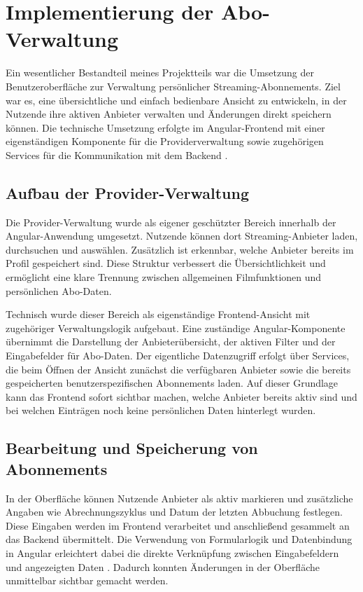 ﻿
\section{Implementierung der Abo-Verwaltung}
Ein wesentlicher Bestandteil meines Projektteils war die Umsetzung der Benutzeroberfläche zur Verwaltung persönlicher Streaming-Abonnements. Ziel war es, eine übersichtliche und einfach bedienbare Ansicht zu entwickeln, in der Nutzende ihre aktiven Anbieter verwalten und Änderungen direkt speichern können. Die technische Umsetzung erfolgte im Angular-Frontend mit einer eigenständigen Komponente für die Providerverwaltung sowie zugehörigen Services für die Kommunikation mit dem Backend \cite{angular_overview,angular_forms}.

\subsection{Aufbau der Provider-Verwaltung}
Die Provider-Verwaltung wurde als eigener geschützter Bereich innerhalb der Angular-Anwendung umgesetzt. Nutzende können dort Streaming-Anbieter laden, durchsuchen und auswählen. Zusätzlich ist erkennbar, welche Anbieter bereits im Profil gespeichert sind. Diese Struktur verbessert die Übersichtlichkeit und ermöglicht eine klare Trennung zwischen allgemeinen Filmfunktionen und persönlichen Abo-Daten.

Technisch wurde dieser Bereich als eigenständige Frontend-Ansicht mit zugehöriger Verwaltungslogik aufgebaut. Eine zuständige Angular-Komponente übernimmt die Darstellung der Anbieterübersicht, der aktiven Filter und der Eingabefelder für Abo-Daten. Der eigentliche Datenzugriff erfolgt über Services, die beim Öffnen der Ansicht zunächst die verfügbaren Anbieter sowie die bereits gespeicherten benutzerspezifischen Abonnements laden. Auf dieser Grundlage kann das Frontend sofort sichtbar machen, welche Anbieter bereits aktiv sind und bei welchen Einträgen noch keine persönlichen Daten hinterlegt wurden.

\subsection{Bearbeitung und Speicherung von Abonnements}
In der Oberfläche können Nutzende Anbieter als aktiv markieren und zusätzliche Angaben wie Abrechnungszyklus und Datum der letzten Abbuchung festlegen. Diese Eingaben werden im Frontend verarbeitet und anschließend gesammelt an das Backend übermittelt. Die Verwendung von Formularlogik und Datenbindung in Angular erleichtert dabei die direkte Verknüpfung zwischen Eingabefeldern und angezeigten Daten \cite{angular_forms}. Dadurch konnten Änderungen in der Oberfläche unmittelbar sichtbar gemacht werden.

